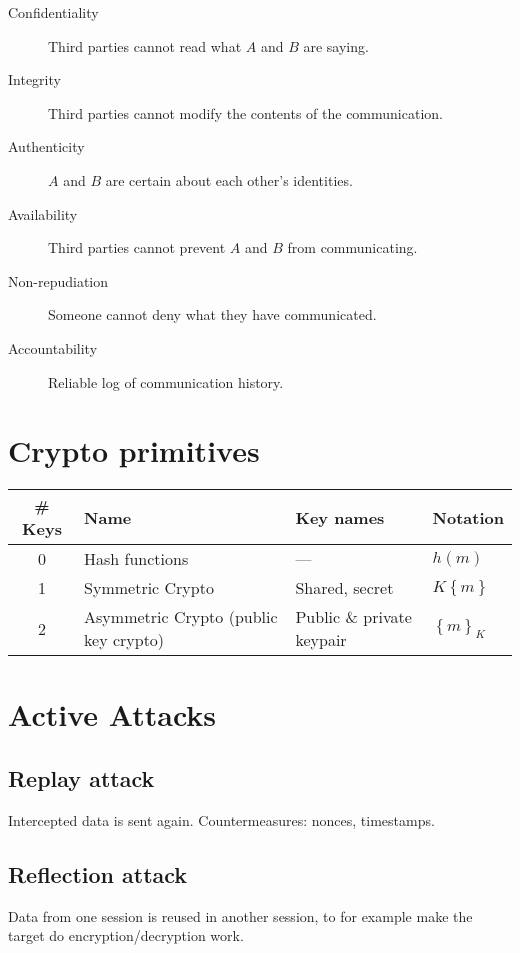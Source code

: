 \documentclass{article}
\begin{document}
\begin{description}
  \item[Confidentiality] Third parties cannot read what $A$ and $B$ are saying.
  \item[Integrity] Third parties cannot modify the contents of the communication.
  \item[Authenticity] $A$ and $B$ are certain about each other's identities.
  \item[Availability] Third parties cannot prevent $A$ and $B$ from communicating.
  \item[Non-repudiation] Someone cannot deny what they have communicated.
  \item[Accountability] Reliable log of communication history.
\end{description}

\section{Crypto primitives}

\begin{tabular}[h]{c||p{100pt}|l|l}
  \bf \# Keys & \bf Name & \bf Key names & \bf Notation \\ \hline \hline
  0 & Hash functions & --- & $h(m)$ \\ \hline
  1 & Symmetric Crypto & Shared, secret & $K\left\{ m \right\}$  \\\hline
  2 & Asymmetric Crypto (public key crypto) & Public \& private keypair & $\left\{ m \right\}_K$ \\
\end{tabular}

\section{Active Attacks}

\subsection{Replay attack}

Intercepted data is sent again. Countermeasures: nonces, timestamps.

\subsection{Reflection attack}

Data from one session is reused in another session, to for example make the
target do encryption/decryption work.
\end{document}
